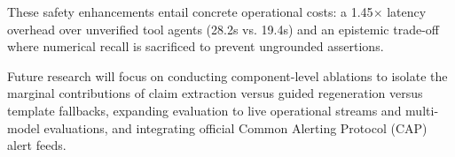\documentclass[conference]{IEEEtran}
\begin{document}
These safety enhancements entail concrete operational costs: a 1.45$\times$ latency overhead over unverified tool agents (28.2s vs. 19.4s) and an epistemic trade-off where numerical recall is sacrificed to prevent ungrounded assertions.

Future research will focus on conducting component-level ablations to isolate the marginal contributions of claim extraction versus guided regeneration versus template fallbacks, expanding evaluation to live operational streams and multi-model evaluations, and integrating official Common Alerting Protocol (CAP) alert feeds.



\end{document}
